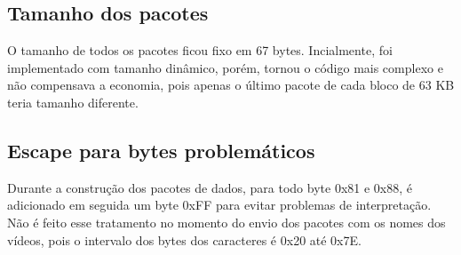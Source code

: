 \documentclass[a4paper, 12pt]{article}
\begin{document}
\subsection{Tamanho dos pacotes}
O tamanho de todos os pacotes ficou fixo em 67 bytes. Incialmente, foi implementado
com tamanho dinâmico, porém, tornou o código mais complexo e não compensava a economia,
pois apenas o último pacote de cada bloco de 63 KB teria tamanho diferente.

\subsection{Escape para bytes problemáticos}
Durante a construção dos pacotes de dados, para todo byte 0x81 e 0x88, é adicionado em seguida
um byte 0xFF para evitar problemas de interpretação. Não é feito esse tratamento no momento
do envio dos pacotes com os nomes dos vídeos, pois o intervalo dos bytes dos caracteres é 
0x20 até 0x7E.
\end{document}

